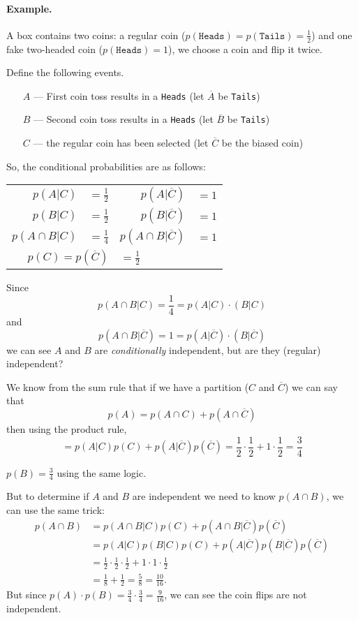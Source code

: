 \paragraph{Example.}
A box contains two coins: a regular coin ($p(\texttt{Heads})=p(\texttt{Tails})=\frac{1}{2}$) and one fake two-headed coin ($p(\texttt{Heads})=1$), 
we choose a coin and flip it twice.  

Define the following events.
\begin{itemize}
\item[$A$] --- First coin toss results in a \texttt{Heads} (let $\overline{A}$ be \texttt{Tails})
\item[$B$] --- Second coin toss results in a \texttt{Heads}  (let $\overline{B}$ be \texttt{Tails})
\item[$C$] --- the regular coin has been selected  (let $\overline{C}$ be the biased coin)
\end{itemize}

So, the conditional probabilities are as follows: 
\begin{center}\begin{tabular}{rlrl}
$p(A|C)$ & $= \frac{1}{2}$ & $p(A|\overline{C})$ & $= 1$\\
$p(B|C)$ & $= \frac{1}{2}$ & $p(B|\overline{C})$ & $= 1$\\
$p(A\cap B|C)$ & $= \frac{1}{4}$ & $p(A\cap B|\overline{C})$ & $= 1$\\
\multicolumn{2}{r}{$p(C)=p(\overline{C})$} & \multicolumn{2}{l}{$=\frac{1}{2}$}
\end{tabular}\end{center}

Since \[p(A\cap B|C) = \frac{1}{4} = p(A|C)\cdotp(B|C)\]
and \[p(A\cap B|\overline{C}) = 1 = p(A|\overline{C})\cdotp(B|\overline{C})\]
we can see $A$ and $B$ are \textit{conditionally} independent,
but are they (regular) independent? 

We know from the sum rule that if we have a partition ($C$ and $\overline C$) we can say that 
\[p(A) = p(A\cap C) + p(A \cap \overline{C})\]
then using the product rule, 
\[=p(A|C)p(C) + p(A|\overline{C})p(\overline{C}) = \frac{1}{2}\cdot \frac{1}{2} + 1\cdot\frac{1}{2} = \frac{3}{4}\]

$p(B)=\frac{3}{4}$ using the same logic.

But to determine if $A$ and $B$ are independent we need to know $p(A\cap B)$, we can use the same trick: 
\begin{align*}
p(A\cap B) &= p(A\cap B|C)p(C) + p(A\cap B|\overline{C})p(\overline{C})\\
	& = p(A|C)p(B|C)p(C) + p(A|\overline{C})p(B|\overline{C})p(\overline{C}) \\
	& = \frac{1}{2}\cdot\frac{1}{2}\cdot\frac{1}{2}+1\cdot1\cdot\frac{1}{2}\\
	& = \frac{1}{8} + \frac{1}{2} = \frac{5}{8} = \frac{10}{16}.
\end{align*}
But since $p(A)\cdot p(B) = \frac{3}{4}\cdot\frac{3}{4} = \frac{9}{16}$, 
we can see the coin flips are not independent. 

